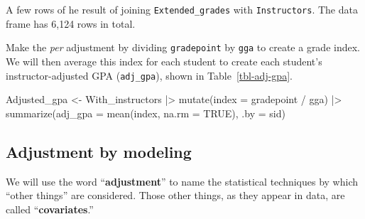 \documentclass[
  letterpaper,
  DIV=11,
  numbers=noendperiod,
  oneside]{scrartcl}
\newenvironment{Shaded}{\begin{snugshade}}{\end{snugshade}}
\newcommand{\AttributeTok}[1]{\textcolor[rgb]{0.40,0.45,0.13}{#1}}
\newcommand{\ConstantTok}[1]{\textcolor[rgb]{0.56,0.35,0.01}{#1}}
\newcommand{\FunctionTok}[1]{\textcolor[rgb]{0.28,0.35,0.67}{#1}}
\newcommand{\NormalTok}[1]{\textcolor[rgb]{0.00,0.23,0.31}{#1}}
\newcommand{\OtherTok}[1]{\textcolor[rgb]{0.00,0.23,0.31}{#1}}
\newcommand{\SpecialCharTok}[1]{\textcolor[rgb]{0.37,0.37,0.37}{#1}}
\begin{document}
A few rows of he result of joining \texttt{Extended\_grades} with
\texttt{Instructors}. The data frame has 6,124 rows in total.

Make the \emph{per} adjustment by dividing \texttt{gradepoint} by
\texttt{gga} to create a grade index. We will then average this index
for each student to create each student's instructor-adjusted GPA
(\texttt{adj\_gpa}), shown in Table~\ref{tbl-adj-gpa}.

\begin{Shaded}
\begin{Highlighting}[]
\NormalTok{Adjusted\_gpa }\OtherTok{\textless{}{-}}
\NormalTok{  With\_instructors }\SpecialCharTok{|\textgreater{}}
  \FunctionTok{mutate}\NormalTok{(}\AttributeTok{index =}\NormalTok{ gradepoint }\SpecialCharTok{/}\NormalTok{ gga) }\SpecialCharTok{|\textgreater{}}
  \FunctionTok{summarize}\NormalTok{(}\AttributeTok{adj\_gpa =} \FunctionTok{mean}\NormalTok{(index, }\AttributeTok{na.rm =} \ConstantTok{TRUE}\NormalTok{), }\AttributeTok{.by =}\NormalTok{ sid)}
\end{Highlighting}
\end{Shaded}


\subsection{Adjustment by modeling}\label{sec-adjustment-by-modeling}

We will use the word ``\textbf{adjustment}'' to name the statistical
techniques by which ``other things'' are considered. Those other things,
as they appear in data, are called ``\textbf{covariates}.''
\end{document}
